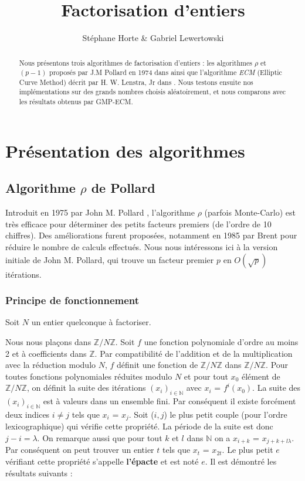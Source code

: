 \documentclass[11pt,a4paper]{article}
\title{Factorisation d'entiers}
\author{Stéphane Horte \& Gabriel Lewertowski}
\begin{document}
\maketitle

\tableofcontents
\newpage

\begin{abstract}
Nous présentons trois algorithmes de factorisation d'entiers : les algorithmes \textit{$\rho$} et \textit{$(p-1)$} proposés par J.M Pollard en 1974 dans \cite{pollard_rho} ainsi que l'algorithme \textit{ECM} (Elliptic Curve Method) décrit par H. W. Lenstra, Jr dans \cite{lenstra}. Nous testons ensuite nos implémentations sur des grands nombres choisis aléatoirement, et nous comparons avec les résultats obtenus par \textsf{GMP-ECM}.
\end{abstract}

\section{Présentation des algorithmes}
\subsection{Algorithme $\rho$ de Pollard}
Introduit en 1975 par John M. Pollard \cite{pollard_rho}, l'algorithme $\rho$ (parfois Monte-Carlo) est très efficace pour déterminer des petits facteurs premiers (de l'ordre de 10 chiffres). Des améliorations furent proposées, notamment en 1985 par Brent \cite{brent85} pour réduire le nombre de calculs effectués. Nous nous intéressons ici à la version initiale de John M. Pollard, qui trouve un facteur premier $p$ en $O(\sqrt{p})$ itérations.
\subsubsection{Principe de fonctionnement}
\label{rho}

Soit $N$ un entier quelconque à factoriser.
	
Nous nous plaçons dans $\mathbb{Z}/N\mathbb{Z}$. Soit $f$ une fonction polynomiale d'ordre au moins 2 et à coefficients dans  $\mathbb{Z}$. Par compatibilité de l'addition et de la multiplication avec la réduction modulo $N$, $f$ définit une fonction de $\mathbb{Z}/N\mathbb{Z}$ dans $\mathbb{Z}/N\mathbb{Z}$. Pour toutes fonctions polynomiales réduites modulo $N$ et pour tout $x_0$ élément de $\mathbb{Z}/N\mathbb{Z}$, on définit la suite des itérations  $(x_i)_{i \in \mathbb{N}}$ avec $x_i$ = $f^i(x_0)$. La suite des $(x_i)_{i \in \mathbb{N}}$ est à valeurs dans un ensemble fini. Par conséquent il existe forcément deux indices $i \neq j$ tels que $x_i$ = $x_j$. Soit ($i,j$) le plus petit couple (pour l'ordre lexicographique) qui vérifie cette propriété. La période de la suite est donc $j-i = \lambda$. On remarque aussi que pour tout $k$ et $l$ dans $\mathbb{N}$ on a $x_{i+k}$ = $x_{j+k+l\lambda}$. Par conséquent on peut trouver un entier $t$ tels que $x_t$ = $x_{2t}$. Le plus petit $e$ vérifiant cette propriété s'appelle \textbf{l'épacte} et est noté $e$. Il est démontré les résultats suivants :
	
\end{document}
